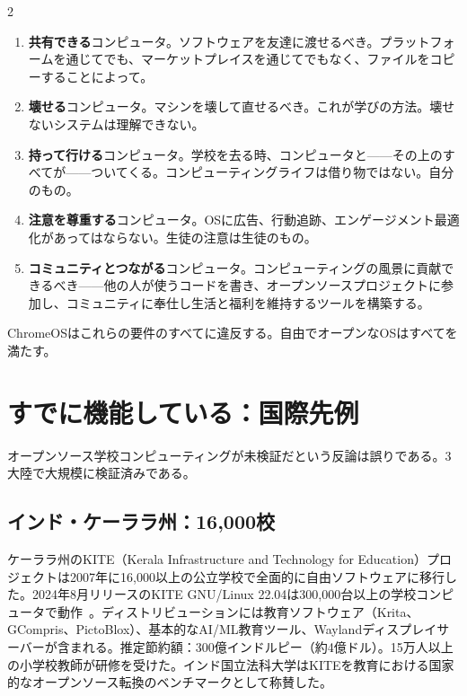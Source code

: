 \documentclass[11pt, a4paper]{article}
\begin{document}
\begin{multicols}{2}
\begin{enumerate}
  \item \textbf{共有できる}コンピュータ。ソフトウェアを友達に渡せるべき。プラットフォームを通じてでも、マーケットプレイスを通じてでもなく、ファイルをコピーすることによって。

  \item \textbf{壊せる}コンピュータ。マシンを壊して直せるべき。これが学びの方法。壊せないシステムは理解できない。

  \item \textbf{持って行ける}コンピュータ。学校を去る時、コンピュータと——その上のすべてが——ついてくる。コンピューティングライフは借り物ではない。自分のもの。

  \item \textbf{注意を尊重する}コンピュータ。OSに広告、行動追跡、エンゲージメント最適化があってはならない。生徒の注意は生徒のもの。

  \item \textbf{コミュニティとつながる}コンピュータ。コンピューティングの風景に貢献できるべき——他の人が使うコードを書き、オープンソースプロジェクトに参加し、コミュニティに奉仕し生活と福利を維持するツールを構築する。
\end{enumerate}

ChromeOSはこれらの要件のすべてに違反する。自由でオープンなOSはすべてを満たす。


\section{すでに機能している：国際先例}

オープンソース学校コンピューティングが未検証だという反論は誤りである。3大陸で大規模に検証済みである。

\subsection{インド・ケーララ州：16,000校}

ケーララ州のKITE（Kerala Infrastructure and Technology for Education）プロジェクトは2007年に16,000以上の公立学校で全面的に自由ソフトウェアに移行した。2024年8月リリースのKITE GNU/Linux 22.04は300,000台以上の学校コンピュータで動作~\citep{kite2024gnulinux}。ディストリビューションには教育ソフトウェア（Krita、GCompris、PictoBlox）、基本的なAI/ML教育ツール、Waylandディスプレイサーバーが含まれる。推定節約額：300億インドルピー（約4億ドル）。15万人以上の小学校教師が研修を受けた。インド国立法科大学はKITEを教育における国家的なオープンソース転換のベンチマークとして称賛した。


\end{multicols}
\end{document}

